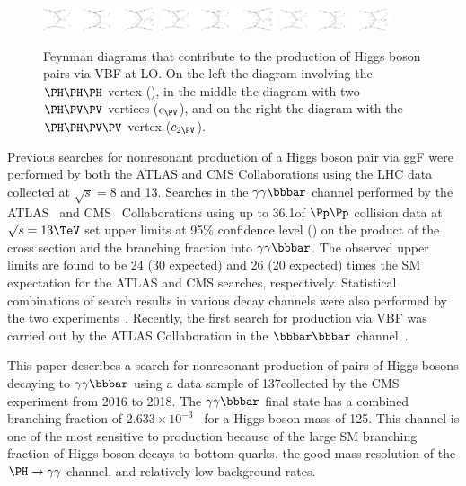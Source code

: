 \documentclass[11pt,twoside,a4paper,cmspaper,final,collab]{cms-tdr}
\begin{document}
\begin{figure}[hbt]
\centering
\includegraphics[width=0.3\textwidth]{Figure_002-a.pdf}      
\includegraphics[width=0.3\textwidth]{Figure_002-b.pdf}
\includegraphics[width=0.29\textwidth]{Figure_002-c.pdf}
\caption{Feynman diagrams that contribute to the production of Higgs boson pairs via VBF at LO. On the left the diagram involving the $\PH\PH\PH$ vertex (\lbdHHH), in the middle the diagram with two $\HVV$ vertices ($\conev$), and on the right the diagram with the $\HHVV$ vertex ($\ctwov$).\label{fig:diavbf}}
\end{figure}

Previous searches for nonresonant production of a Higgs boson pair via ggF were performed by both the ATLAS and CMS Collaborations using the LHC data collected at $\sqrt{s}=8$ and 13\TeV \cite{Aad:2014yja, Aad:2015uka, Aad:2015xja, Aaboud:2016xco,Aad:2019uzh,Khachatryan:2016sey,Aaboud:2018ftw,Aad:2019uzh,Sirunyan:2017tqo, Sirunyan:2017djm, Sirunyan:2017guj,Sirunyan:2018iwt}. Searches in the $\bbgg$ channel performed by the ATLAS~\cite{Aaboud:2018ftw} and CMS~\cite{Sirunyan:2018iwt} Collaborations using up to 36.1\fbinv of $\Pp\Pp$ collision data at $\sqrt{s}=13\TeV$ set upper limits at 95\% confidence level (\CL) on the product of the \HH cross section and the branching fraction into $\bbgg$. The observed upper limits are found to be 24 (30 expected) and 26 (20 expected) times the SM expectation for the ATLAS and CMS searches, respectively.
Statistical combinations of search results in various decay
channels were also performed by the two experiments~\cite{Aad:2019uzh,Sirunyan:2018ayu}. 
Recently, the first search for \HH production via VBF was carried out by the ATLAS Collaboration in the $\bbbb$ channel~\cite{Aad:2020kub}. 

This paper describes a search for nonresonant
production of pairs of Higgs bosons decaying to $\bbgg$
using a data sample of 137\fbinv collected by the CMS experiment from 2016 to 2018.
The $\bbgg$ final state has a combined branching fraction of $2.633\times 10^{-3}$~\cite{deFlorian:2016spz} for a Higgs boson mass of 125\GeV.
This channel is one of the most sensitive to \HH production because of the large SM branching fraction of Higgs boson decays to bottom quarks, the good mass resolution of the $\PH \to \gamma \gamma$ channel, and relatively low background rates.
\end{document}
